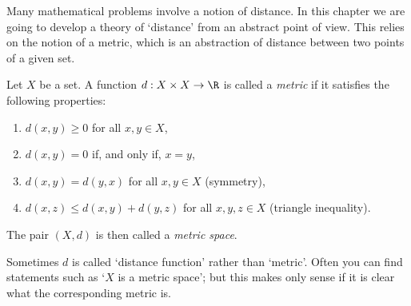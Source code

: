 %
%


\gdef\fpdf{./frame/slnotesfigsanno2}  %



Many mathematical problems involve a notion of distance. In this chapter we
are going to develop a theory of `distance' from an abstract point of view. This relies
on the notion of a metric, which is an abstraction of distance between two
points of a given set.

\begin{definition}
Let $X$ be a set. A function $d : X \times X \to \R$ is called
a \emph{metric} if it satisfies the following properties:
\begin{enumerate}
\item \label{def:non-negative} $d(x,y) \ge 0$ for all $x,y \in X$,
\item \label{def:positive} $d(x,y) = 0$ if, and only if, $x = y$,
\item \label{def:symmetry} $d(x,y) = d(y,x)$ for all $x,y \in X$ (symmetry),
\item \label{def:triangle} $d(x,z) \le d(x,y) + d(y,z)$ for all $x,y,z \in X$ (triangle inequality).
\end{enumerate}
The pair $(X,d)$ is then called a \emph{metric space}.
\end{definition}

Sometimes $d$ is called `distance function' rather than `metric'. Often you can
find statements such as `$X$ is a metric space'; but this makes only sense if
it is clear what the corresponding metric is. 

